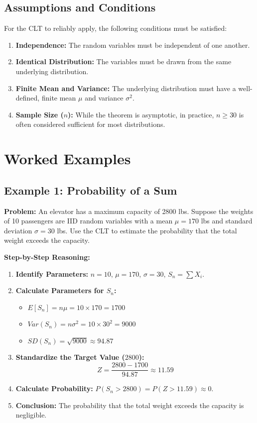 \documentclass[11pt]{article}
\begin{document}
\subsection{Assumptions and Conditions}
For the CLT to reliably apply, the following conditions must be satisfied:
\begin{enumerate}
    \item \textbf{Independence:} The random variables must be independent of one another.
    \item \textbf{Identical Distribution:} The variables must be drawn from the same underlying distribution.
    \item \textbf{Finite Mean and Variance:} The underlying distribution must have a well-defined, finite mean $\mu$ and variance $\sigma^2$.
    \item \textbf{Sample Size ($n$):} While the theorem is asymptotic, in practice, $n \ge 30$ is often considered sufficient for most distributions.
\end{enumerate}

\section{Worked Examples}
\subsection{Example 1: Probability of a Sum}
\textbf{Problem:} An elevator has a maximum capacity of 2800 lbs. Suppose the weights of 10 passengers are IID random variables with a mean $\mu = 170$ lbs and standard deviation $\sigma = 30$ lbs. Use the CLT to estimate the probability that the total weight exceeds the capacity.

\textbf{Step-by-Step Reasoning:}
\begin{enumerate}
    \item \textbf{Identify Parameters:} $n = 10$, $\mu = 170$, $\sigma = 30$, $S_n = \sum X_i$.
    \item \textbf{Calculate Parameters for $S_n$:}
    \begin{itemize}
        \item $E[S_n] = n\mu = 10 \times 170 = 1700$
        \item $Var(S_n) = n\sigma^2 = 10 \times 30^2 = 9000$
        \item $SD(S_n) = \sqrt{9000} \approx 94.87$
    \end{itemize}
    \item \textbf{Standardize the Target Value ($2800$):}
    \[ Z = \frac{2800 - 1700}{94.87} \approx 11.59 \]
    \item \textbf{Calculate Probability:} $P(S_n > 2800) = P(Z > 11.59) \approx 0$.
    \item \textbf{Conclusion:} The probability that the total weight exceeds the capacity is negligible.
\end{enumerate}
\end{document}
